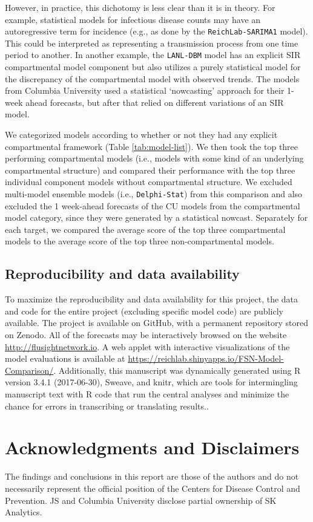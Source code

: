 \documentclass{article}\usepackage[]{graphicx}\usepackage[]{color}
\begin{document}
However, in practice, this dichotomy is less clear than it is in theory.
For example, statistical models for infectious disease counts may have an autoregressive term for incidence (e.g., as done by the {\tt ReichLab-SARIMA1} model).
This could be interpreted as representing a transmission process from one time period to another.
In another example, the {\tt LANL-DBM} model has an explicit SIR compartmental model component but also utilizes a purely statistical model for the discrepancy of the compartmental model with observed trends.
The models from Columbia University used a statistical `nowcasting' approach for their 1-week ahead forecasts, but after that relied on different variations of an SIR model.

We categorized models according to whether or not they had any explicit compartmental framework (Table \ref{tab:model-list}). 
We then took the top three performing compartmental models (i.e., models with some kind of an underlying compartmental structure) and compared their performance with the top three individual component models without compartmental structure. 
We excluded multi-model ensemble models (i.e., {\tt Delphi-Stat}) from this comparison and also excluded the 1 week-ahead forecasts of the CU models from the compartmental model category, since they were generated by a statistical nowcast.
Separately for each target, we compared the average score of the top three compartmental models to the average score of the top three non-compartmental models.

\subsection*{Reproducibility and data availability}

To maximize the reproducibility and data availability for this project, the data and code for the entire project (excluding specific model code) are publicly available.
The project is available on GitHub\cite{fsngithub2018}, with a permanent repository stored on Zenodo\cite{fsnzenodo2018}.
All of the forecasts may be interactively browsed on the website \url{http://flusightnetwork.io}.
A web applet with interactive visualizations of the model evaluations is available at \url{https://reichlab.shinyapps.io/FSN-Model-Comparison/}. 
Additionally, this manuscript was dynamically generated using R version 3.4.1 (2017-06-30), Sweave, and knitr, which are tools for intermingling manuscript text with R code that run the central analyses and minimize the chance for errors in transcribing or translating results.\cite{Xie2015,RCore2017}.


\section*{Acknowledgments and Disclaimers}

The findings and conclusions in this report are those of the authors and do not necessarily represent the official position of the Centers for Disease Control and Prevention.
JS and Columbia University disclose partial ownership of SK Analytics.



\end{document}
